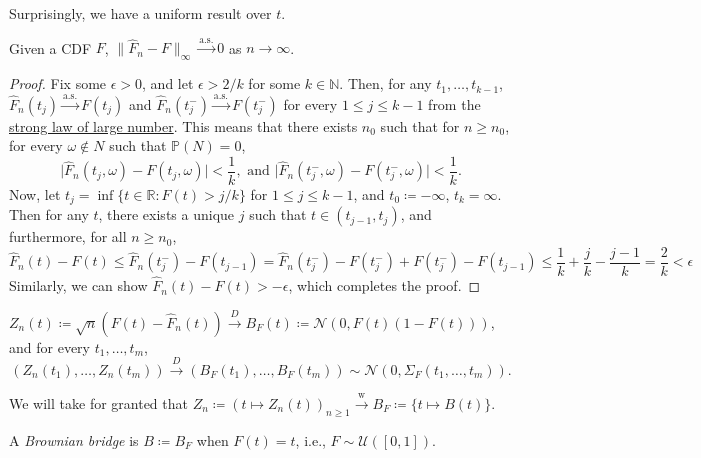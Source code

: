 Surprisingly, we have a uniform result over \(t\).

\begin{theorem}\label{thm:Glivenko-Cantelli}
	Given a CDF \(F\), \(\lVert \hat{F} _n - F \rVert _\infty \overset{\text{a.s.} }{\to} 0\) as \(n \to \infty \).
\end{theorem}
\begin{proof}
	Fix some \(\epsilon > 0\), and let \(\epsilon > 2 / k\) for some \(k \in \mathbb{N} \). Then, for any \(t_1, \dots , t_{k-1}\), \(\hat{F} _n (t_j) \overset{\text{a.s.} }{\to } F(t_j)\) and \(\hat{F} _n(t_j^-) \overset{\text{a.s.} }{\to} F(t_j^-)\) for every \(1 \leq j \leq k-1\) from the \hyperref[thm:SLLN]{strong law of large number}. This means that there exists \(n_0\) such that for \(n \geq n_0\), for every \(\omega \notin N\) such that \(\mathbb{P} (N) = 0\),
	\[
		\vert \hat{F} _n(t_j, \omega ) - F(t_j, \omega ) \vert < \frac{1}{k} ,\text{ and }
		\vert \hat{F} _n(t_j^-, \omega ) - F(t_j^-, \omega ) \vert < \frac{1}{k}.
	\]
	Now, let \(t_j = \inf \{ t \in \mathbb{R} \colon F(t) > j / k \}\) for \(1 \leq j \leq k-1\), and \(t_0 \coloneqq -\infty \), \(t_k = \infty \). Then for any \(t\), there exists a unique \(j\) such that \(t \in (t_{j-1}, t_j)\), and furthermore, for all \(n \geq n_0\),
	\[
		\hat{F} _n(t) - F(t)
		\leq \hat{F} _n(t_j^-) - F(t_{j-1})
		= \hat{F} _n(t_j^-) - F(t_j^-) + F(t_j^-) - F(t_{j-1})
		\leq \frac{1}{k} + \frac{j}{k} - \frac{j-1}{k}
		= \frac{2}{k}
		< \epsilon
	\]
	Similarly, we can show \(\hat{F} _n(t) - F(t) > - \epsilon \), which completes the proof.
\end{proof}

\begin{prev}
	\(Z_n(t) \coloneqq \sqrt{n} (F(t) - \hat{F} _n(t)) \overset{D}{\to} B_F(t) \coloneqq \mathcal{N} (0, F(t) (1 - F(t)))\), and for every \(t_1, \dots , t_m\),
	\[
		(Z_n(t_1), \dots , Z_n(t_m)) \overset{D}{\to} (B_F(t_1), \dots , B_F(t_m)) \sim \mathcal{N} (0, \Sigma _F(t_1, \dots , t_m)).
	\]
\end{prev}

We will take for granted that \(Z_n \coloneqq (t \mapsto Z_n(t))_{n \geq 1} \overset{\text{w} }{\to} B_F \coloneqq \{ t \mapsto B(t) \} \).

\begin{definition}\label{def:Brownian-bridge}
	A \emph{Brownian bridge} is \(B \coloneqq B_F\) when \(F(t) = t\), i.e., \(F \sim \mathcal{U} ([0, 1])\).
\end{definition}

